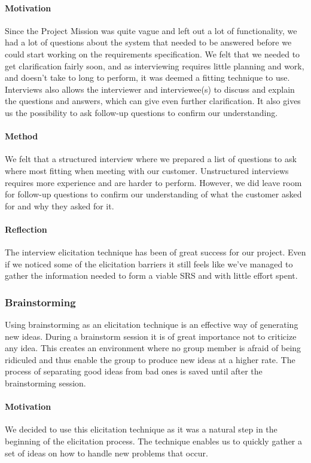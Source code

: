 \documentclass[10pt]{article}
\begin{document}
\paragraph{Motivation}
\hfill \break

Since the Project Mission was quite vague and left out a lot of functionality, we had a lot of questions about the system that needed to be answered before we could start working on the requirements specification. We felt that we needed to get clarification fairly soon, and as interviewing requires little planning and work, and doesn’t take to long to perform, it was deemed a fitting technique to use. Interviews also allows the interviewer and interviewee(s) to discuss and explain the questions and answers, which can give even further clarification. It also gives us the possibility to ask follow-up questions to confirm our understanding.
\paragraph{Method}
\hfill \break
We felt that a structured interview where we prepared a list of questions to ask where most fitting when meeting with our customer. Unstructured interviews requires more experience and are harder to perform. However, we did leave room for follow-up questions to confirm our understanding of what the customer asked for and why they asked for it. 
\paragraph{Reflection}
\hfill \break
The interview elicitation technique has been of great success for our project. Even if we noticed some of the elicitation barriers it still feels like we've managed to gather the information needed to form a viable SRS and with little effort spent.

\subsubsection{Brainstorming}
Using brainstorming as an elicitation technique is an effective way of generating new ideas. During a brainstorm session it is of great importance not to criticize any idea. This creates an environment where no group member is afraid of being ridiculed and thus enable the group to produce new ideas at a higher rate.
The process of separating good ideas from bad ones is saved until after the brainstorming session.
\paragraph{Motivation}
\hfill \break
We decided to use this elicitation technique as it was a natural step in the beginning of the elicitation process. The technique enables us to quickly gather a set of ideas on how to handle new problems that occur.
\end{document}
